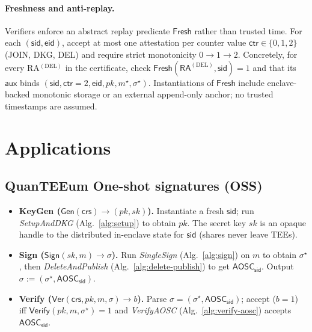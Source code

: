 \documentclass[runningheads,orivec]{llncs}
\newcommand{\prot}{\textsf{QuanTEEum}}
\newcommand{\sid}{\mathsf{sid}}
\begin{document}
\paragraph{Freshness and anti-replay.}
Verifiers enforce an abstract replay predicate $\textsf{Fresh}$ rather than trusted time. For each $(\sid,\mathsf{eid})$, accept at most one attestation per counter value $\mathsf{ctr}\!\in\!\{0,1,2\}$ (JOIN, DKG, DEL) and require strict monotonicity $0\!\rightarrow\!1\!\rightarrow\!2$. Concretely, for every RA$^{(\mathrm{DEL})}$ in the certificate, check $\textsf{Fresh}(\mathsf{RA}^{(\mathrm{DEL})},\sid){=}1$ and that its $\mathsf{aux}$ binds $(\sid,\mathsf{ctr}{=}2,\mathsf{eid},pk,m^{\star},\sigma^{\star})$. Instantiations of $\textsf{Fresh}$ include enclave-backed monotonic storage or an external append-only anchor; no trusted timestamps are assumed.

\section{Applications}\label{sec:apps}

\subsection{\prot{} One-shot signatures (OSS)}\label{sec:app-oss}
\begin{itemize}[leftmargin=*,itemsep=0.25em]
  \item \textbf{KeyGen (\(\mathsf{Gen}(\mathsf{crs})\!\to\!(pk,sk)\)).} Instantiate a fresh \(\sid\); run \emph{SetupAndDKG} (Alg.~\ref{alg:setup}) to obtain \(pk\). The secret key \(sk\) is an opaque handle to the distributed in-enclave state for \(\sid\) (shares never leave TEEs).
  \item \textbf{Sign (\(\mathsf{Sign}(sk,m)\!\to\!\sigma\)).} Run \emph{SingleSign} (Alg.~\ref{alg:sign}) on \(m\) to obtain \(\sigma^{\star}\), then \emph{DeleteAndPublish} (Alg.~\ref{alg:delete-publish}) to get \(\mathsf{AOSC}_{\sid}\). Output \(\sigma := (\sigma^{\star}, \mathsf{AOSC}_{\sid})\).
  \item \textbf{Verify (\(\mathsf{Ver}(\mathsf{crs},pk,m,\sigma)\!\to\! b\)).} Parse \(\sigma=(\sigma^{\star},\mathsf{AOSC}_{\sid})\); accept (\(b{=}1\)) iff \(\mathsf{Verify}(pk,m,\sigma^{\star})=1\) and \emph{VerifyAOSC} (Alg.~\ref{alg:verify-aosc}) accepts \(\mathsf{AOSC}_{\sid}\).
\end{itemize}
\end{document}
